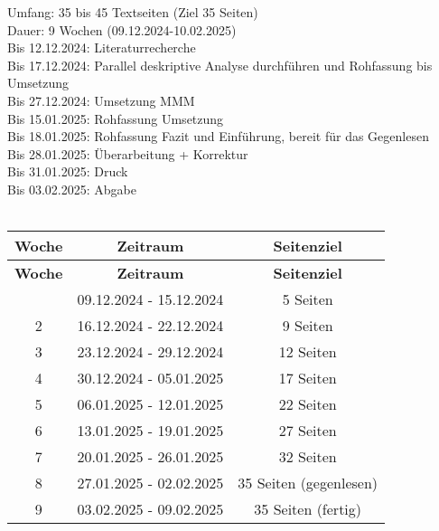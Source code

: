 
\newpage
Umfang: 35 bis 45 Textseiten (Ziel 35 Seiten)\\
Dauer: 9 Wochen (09.12.2024-10.02.2025)\\
Bis 12.12.2024: Literaturrecherche\\
Bis 17.12.2024: Parallel deskriptive Analyse durchführen und Rohfassung bis Umsetzung\\
Bis 27.12.2024: Umsetzung MMM\\
Bis 15.01.2025: Rohfassung Umsetzung\\
Bis 18.01.2025: Rohfassung Fazit und Einführung, bereit für das Gegenlesen \\
Bis 28.01.2025: Überarbeitung + Korrektur\\
Bis 31.01.2025: Druck\\
Bis 03.02.2025: Abgabe\\

\\

\begin{longtable}{|c|c|c|}
\hline
\textbf{Woche} & \textbf{Zeitraum} & \textbf{Seitenziel} \\
\hline
\endfirsthead
\hline
\textbf{Woche} & \textbf{Zeitraum} & \textbf{Seitenziel} \\
\hline
\endhead
\hline
\endfoot
\hline
1 & 09.12.2024 - 15.12.2024 & 5 Seiten \\
2 & 16.12.2024 - 22.12.2024 & 9 Seiten \\
3 & 23.12.2024 - 29.12.2024 & 12 Seiten \\
4 & 30.12.2024 - 05.01.2025 & 17 Seiten \\
5 & 06.01.2025 - 12.01.2025 & 22 Seiten \\
6 & 13.01.2025 - 19.01.2025 & 27 Seiten \\
7 & 20.01.2025 - 26.01.2025 & 32 Seiten \\
8 & 27.01.2025 - 02.02.2025 & 35 Seiten (gegenlesen) \\
9 & 03.02.2025 - 09.02.2025 & 35 Seiten (fertig) \\
\hline
\end{longtable}